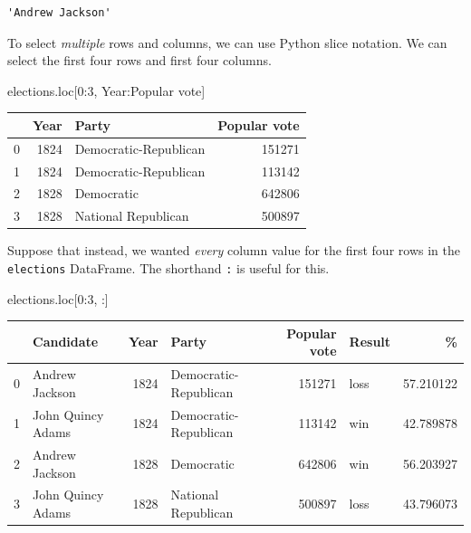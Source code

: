 \documentclass[
  letterpaper,
  DIV=11,
  numbers=noendperiod]{scrreprt}
\newenvironment{Shaded}{\begin{snugshade}}{\end{snugshade}}
\newcommand{\DecValTok}[1]{\textcolor[rgb]{0.68,0.00,0.00}{#1}}
\newcommand{\NormalTok}[1]{\textcolor[rgb]{0.00,0.23,0.31}{#1}}
\newcommand{\StringTok}[1]{\textcolor[rgb]{0.13,0.47,0.30}{#1}}
\begin{document}
\begin{verbatim}
'Andrew Jackson'
\end{verbatim}

To select \emph{multiple} rows and columns, we can use Python slice
notation. We can select the first four rows and first four columns.

\begin{Shaded}
\begin{Highlighting}[]
\NormalTok{elections.loc[}\DecValTok{0}\NormalTok{:}\DecValTok{3}\NormalTok{, }\StringTok{\textquotesingle{}Year\textquotesingle{}}\NormalTok{:}\StringTok{\textquotesingle{}Popular vote\textquotesingle{}}\NormalTok{]}
\end{Highlighting}
\end{Shaded}

\begin{tabular}{lrlr}
\toprule
{} &  Year &                  Party &  Popular vote \\
\midrule
0 &  1824 &  Democratic-Republican &        151271 \\
1 &  1824 &  Democratic-Republican &        113142 \\
2 &  1828 &             Democratic &        642806 \\
3 &  1828 &    National Republican &        500897 \\
\bottomrule
\end{tabular}

Suppose that instead, we wanted \emph{every} column value for the first
four rows in the \texttt{elections} DataFrame. The shorthand \texttt{:}
is useful for this.

\begin{Shaded}
\begin{Highlighting}[]
\NormalTok{elections.loc[}\DecValTok{0}\NormalTok{:}\DecValTok{3}\NormalTok{, :]}
\end{Highlighting}
\end{Shaded}

\begin{tabular}{llrlrlr}
\toprule
{} &          Candidate &  Year &                  Party &  Popular vote & Result &          \% \\
\midrule
0 &     Andrew Jackson &  1824 &  Democratic-Republican &        151271 &   loss &  57.210122 \\
1 &  John Quincy Adams &  1824 &  Democratic-Republican &        113142 &    win &  42.789878 \\
2 &     Andrew Jackson &  1828 &             Democratic &        642806 &    win &  56.203927 \\
3 &  John Quincy Adams &  1828 &    National Republican &        500897 &   loss &  43.796073 \\
\bottomrule
\end{tabular}
\end{document}
